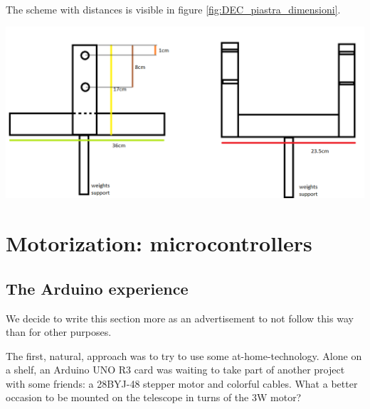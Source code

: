 \documentclass{article}
\begin{document}
\begin{multicols}{2}
\begin{minipage}
        \end{minipage}
        \\
        The scheme with distances is visible in figure \ref{fig:DEC_piastra_dimensioni}.
        \\
        \begin{minipage}
            {0.5\textwidth}
            \centering
            \includegraphics[scale=0.75]{DEC_piastra_dimensioni.png}
            \label{fig:DEC_piastra_dimensioni}
        \end{minipage}

        \section{Motorization: microcontrollers}
        \subsection{The Arduino experience}
        We decide to write this section more as an advertisement to not follow this way than for other purposes.

        The first, natural, approach was to try to use some at-home-technology.
        Alone on a shelf, an Arduino UNO R3 card was waiting to take part of another project with some friends: a 28BYJ-48 stepper motor and colorful cables.
        What a better occasion to be mounted on the telescope in turns of the 3W motor?


\end{multicols}
\end{document}
